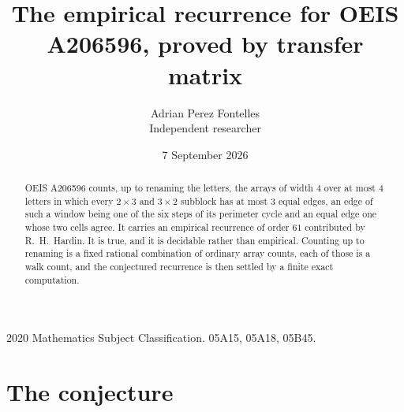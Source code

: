 \documentclass[11pt,a4paper]{article}
\title{The empirical recurrence for OEIS A206596, proved by transfer matrix}
\author{Adrian Perez Fontelles\\ \small Independent researcher}
\date{7 September 2026}
\theoremstyle{plain}
\theoremstyle{definition}
\begin{document}
\maketitle

\begin{abstract}
OEIS A206596 counts, up to renaming the letters, the arrays of width $4$ over at most $4$
letters in which every $2\times3$ and $3\times2$ subblock has at most $3$ equal edges, an edge of such a window being one of the six steps of its perimeter cycle and an equal edge one whose two cells agree. It carries an empirical recurrence of order $61$ contributed by
R.~H.~Hardin. It is true, and it is decidable rather than empirical. Counting up to renaming is
a fixed rational combination of ordinary array counts, each of those is a walk count, and the
conjectured recurrence is then settled by a finite exact computation.
\end{abstract}

\noindent\small 2020 Mathematics Subject Classification. 05A15, 05A18, 05B45.\normalsize

\section{The conjecture}
\end{document}
